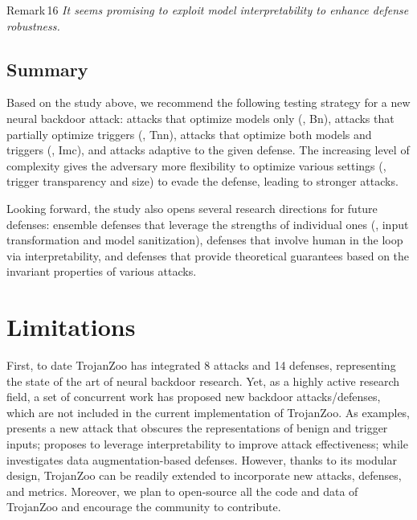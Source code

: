 \documentclass[compsoc,conference,a4paper,10pt,times]{IEEEtran}
\newcommand{\system}{{\sc \small TrojanZoo}\xspace}
\newcommand{\bn}{{\sc Bn}\xspace}
\newcommand{\tnn}{{\sc Tnn}\xspace}
\newcommand{\imc}{{\sc Imc}\xspace}
\begin{document}
\begin{mtbox}{\small Remark\,16}
    {\em \small It seems promising to exploit model interpretability to enhance defense robustness.}
\end{mtbox}

\subsection{Summary}

Based on the study above, we recommend the following testing strategy for a new neural backdoor attack:  attacks that optimize models only (\meg, \bn),  attacks that partially optimize triggers (\meg, \tnn),  attacks that optimize both models and triggers (\meg, \imc), and  attacks adaptive to the given defense. The increasing level of complexity gives the adversary more flexibility to optimize various settings (\meg, trigger transparency and size) to evade the defense, leading to stronger attacks. 


Looking forward, the study also opens several research directions for future defenses:  ensemble defenses that leverage the strengths of individual ones (\meg, input transformation and model sanitization),  defenses that involve human in the loop via interpretability, and  defenses that provide theoretical guarantees based on the invariant properties of various attacks.



\section{Limitations}
\label{sec:discussion}

First, to date \system has integrated 8 attacks and 14 defenses, representing the state of the art of neural backdoor research. Yet, as a highly active research field, a set of concurrent work has proposed new backdoor attacks/defenses, which are not included in the current implementation of \system. As examples,  presents a new  attack that obscures the representations of benign and trigger inputs;  proposes to leverage interpretability to improve attack effectiveness; while  investigates data augmentation-based defenses. However, thanks to its modular design, \system can be readily extended to incorporate new attacks, defenses, and metrics. Moreover, we plan to open-source all the code and data of \system and encourage the community to contribute.
\end{document}
